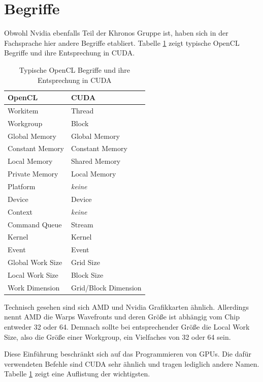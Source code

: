 	    \section{Begriffe}
	    Obwohl Nvidia ebenfalls Teil der Khronos Gruppe ist, haben sich in der Fachsprache hier andere Begriffe etabliert. Tabelle \ref{tab4:begriffe} zeigt typische OpenCL Begriffe und ihre Entsprechung in CUDA.
	    	\begin{table}[h]
	    		\centering
	    		\begin{tabular}{|l|l|}
	    			\toprule 
	    			\textbf{OpenCL} & \textbf{CUDA} \\ \hline\hline
	    			Workitem & Thread \\
	    			Workgroup & Block \\ \hline
	    			Global Memory & Global Memory \\
	    			Constant Memory & Constant Memory \\
	    			Local Memory & Shared Memory \\
	    			Private Memory & Local Memory \\ \hline
	    			Platform & \textit{keine} \\
	    			Device & Device \\
	    			Context & \textit{keine} \\
	    			Command Queue & Stream \\
	    			Kernel & Kernel \\
	    			Event & Event \\ \hline
	    			Global Work Size & Grid Size \\
	    			Local Work Size & Block Size \\
	    			Work Dimension & Grid/Block Dimension \\
	    			\bottomrule
	    		\end{tabular}
	    		\caption{Typische OpenCL Begriffe und ihre Entsprechung in CUDA}
	    		\label{tab4:begriffe}
	    	\end{table}
	    	Technisch gesehen sind sich AMD und Nvidia Grafikkarten ähnlich. Allerdings nennt AMD die \Glspl{Warp} \Glspl{Wavefront} und deren Größe ist abhängig vom Chip entweder 32 oder 64. Demnach sollte bei entsprechender Größe die Local Work Size, also die Größe einer \Gls{Workgroup}, ein Vielfaches von 32 oder 64 sein. 
	    	
	    	Diese Einführung beschränkt sich auf das Programmieren von GPUs. Die dafür verwendeten Befehle sind CUDA sehr ähnlich und tragen lediglich andere Namen. Tabelle \ref{tab4:begriffe} zeigt eine Auflistung der wichtigsten.
	    	
